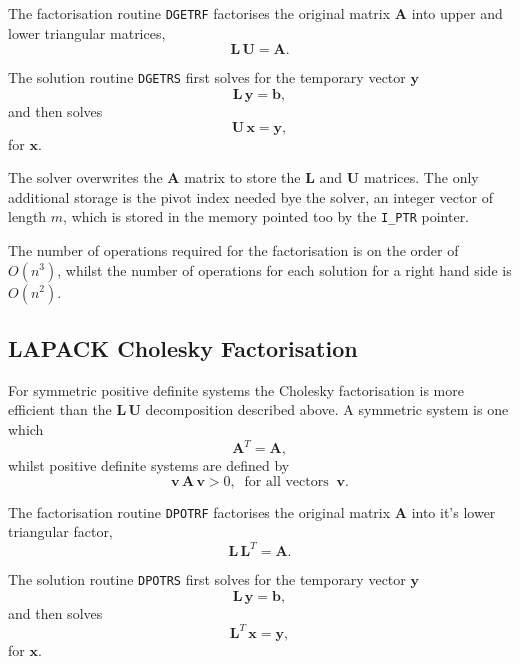 The factorisation routine {\tt DGETRF} factorises the original matrix 
$\mathbf{A}$ into upper and lower triangular matrices,
\begin{equation}\label{e2.1.2}
\mathbf{L \, U = A}.
\end{equation}

The solution routine {\tt DGETRS} first solves for the temporary vector
$\mathbf{y}$
\begin{equation}\label{e2.1.3}
\mathbf{L \, y = b},
\end{equation}
and then solves
\begin{equation}\label{e2.1.4}
\mathbf{U \, x = y},
\end{equation}
for $\mathbf{x}$.

The solver overwrites the $\mathbf{A}$ matrix to store the $\mathbf{L}$ and 
$\mathbf{U}$ matrices. The only additional storage is the pivot index needed
bye the solver, an integer vector of length $m$, which is stored in the
memory pointed too by the {\tt I\_PTR} pointer.

The number of operations required for the factorisation is on the order of 
$O(n^3)$, whilst the number of operations for each solution for a right hand 
side is $O(n^2)$.

\clearpage


\subsection{LAPACK Cholesky Factorisation}\label{s2.2}

For symmetric positive definite systems the Cholesky factorisation is more
efficient than the $\mathbf{L \, U}$ decomposition described above. A symmetric
system is one which
\begin{equation}\label{e2.2.1}
\mathbf{A}^T = \mathbf{A},
\end{equation}
whilst positive definite systems are defined by
\begin{equation}\label{e2.2.2}
\mathbf{v \, A \, v} > 0, \;\; {\text{for all vectors}} \;\; \mathbf{v}.
\end{equation}

The factorisation routine {\tt DPOTRF} factorises the original matrix 
$\mathbf{A}$ into it's lower triangular factor,
\begin{equation}\label{e2.2.3}
\mathbf{L} \, \mathbf{L}^T = \mathbf{A}.
\end{equation}

The solution routine {\tt DPOTRS} first solves for the temporary vector
$\mathbf{y}$
\begin{equation}\label{e2.2.4}
\mathbf{L \, y = b},
\end{equation}
and then solves
\begin{equation}\label{e2.2.5}
\mathbf{L}^T \, \mathbf{x} = \mathbf{y},
\end{equation}
for $\mathbf{x}$.

